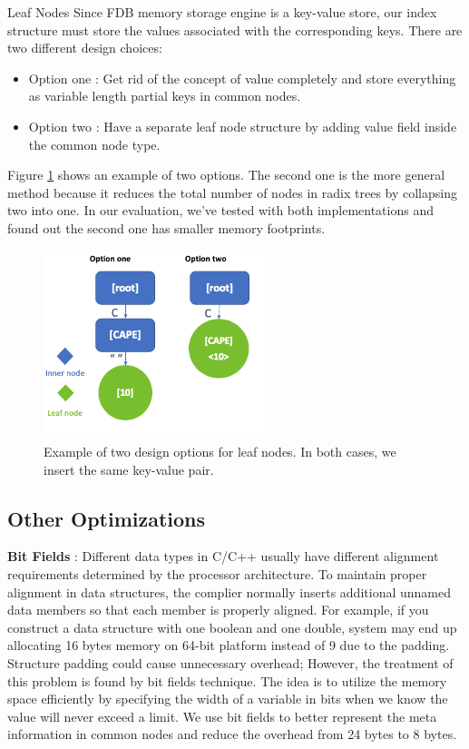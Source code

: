 \documentclass[sigplan,screen,nonacm]{acmart}
\makeatletter
\def\subsubsection{\@startsection{subsubsection}{3}%
  \z@{.5\linespacing\@plus.7\linespacing}{.1\linespacing}%
  {\normalfont\itshape}}
\makeatother
\begin{document}
\subsubsection{Leaf Nodes}
Since FDB memory storage engine is a key-value store, our index structure must store the values associated with the corresponding keys. There are two different design choices: 
\begin{itemize}
    \item Option one : Get rid of the concept of value completely and store everything as variable length partial keys in common nodes. 
    \item Option two : Have a separate leaf node structure by adding value field inside the common node type. 
\end{itemize}
Figure \ref{fig:leaf-nodes} shows an example of two options. The second one is the more general method because it reduces the total number of nodes in radix trees by collapsing two into one. In our evaluation, we’ve tested with both implementations and found out the second one has smaller memory footprints. 
\begin{figure}[h]
  \centering
  \includegraphics[width=\linewidth, height=5.5cm]{pic/leaf nodes.png}
  \setlength{\belowcaptionskip}{-10pt} 
  \caption{Example of two design options for leaf nodes. In both cases, we insert the same key-value pair.}
  \label{fig:leaf-nodes}
\end{figure}

\subsection{Other Optimizations}
\textbf {Bit Fields} \cite{oualline1997practical} : Different data types in C/C++ usually have different alignment requirements determined by the processor architecture. To maintain proper alignment in data structures, the complier normally inserts additional unnamed data members so that each member is properly aligned. For example, if you construct a data structure with one boolean and one double, system may end up allocating 16 bytes memory on 64-bit platform instead of 9 due to the padding. Structure padding could cause unnecessary overhead; However, the treatment of this problem is found by bit fields technique. The idea is to utilize the memory space efficiently by specifying the width of a variable in bits when we know the value will never exceed a limit. We use bit fields to better represent the meta information in common nodes and reduce the overhead from 24 bytes to 8 bytes.
\end{document}

